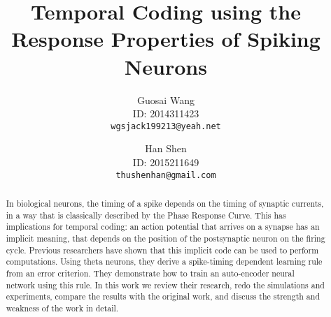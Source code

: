 \documentclass[10pt,twocolumn,letterpaper]{article}
\begin{document}
\title{Temporal Coding using the Response Properties of Spiking Neurons}

\author{
Guosai Wang\\
ID: 2014311423\\
{\tt\small wgsjack199213@yeah.net}
\and
Han Shen\\
ID: 2015211649\\
{\tt\small thushenhan@gmail.com}
}


\maketitle

\begin{abstract}
In biological neurons, the timing of a spike depends on the timing of synaptic currents,
in a way that is classically described by the Phase Response Curve. 
This has implications for temporal coding: an action potential that arrives on a synapse has an implicit meaning, 
that depends on the position of the postsynaptic neuron on the firing cycle. 
Previous researchers have shown that this implicit code can be used to perform computations. 
Using theta neurons, they derive a spike-timing dependent learning rule from an error criterion. 
They demonstrate how to train an auto-encoder neural network using this rule.
In this work we review their research, redo the simulations and experiments, compare the results with the
original work, and discuss the strength and weakness of the work in detail.
\end{abstract}













{\small


}
\end{document}
